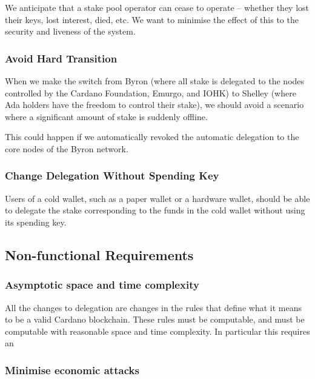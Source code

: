 \documentclass[11pt,a4paper]{article}
\begin{document}
We anticipate that a stake pool operator can cease to operate -- whether
they lost their keys, lost interest, died, etc. We want to minimise the
effect of this to the security and liveness of the system.

\subsubsection{Avoid Hard Transition}\label{avoid-hard-transition}

When we make the switch from Byron (where all stake is delegated to the
nodes controlled by the Cardano Foundation, Emurgo, and IOHK) to Shelley
(where Ada holders have the freedom to control their stake), we should
avoid a scenario where a significant amount of stake is suddenly
offline.

This could happen if we automatically revoked the automatic delegation
to the core nodes of the Byron network.

\subsubsection{Change Delegation Without Spending
Key}\label{change-delegation-without-spending-key}

Users of a cold wallet, such as a paper wallet or a hardware wallet,
should be able to delegate the stake corresponding to the funds in the
cold wallet without using its spending key.

\subsection{Non-functional
Requirements}\label{non-functional-requirements}

\subsubsection{Asymptotic space and time
complexity}\label{asymptotic-space-and-time-complexity}

All the changes to delegation are changes in the rules that define what
it means to be a valid Cardano blockchain. These rules must be
computable, and must be computable with reasonable space and time
complexity. In particular this requires an

\subsubsection{Minimise economic
attacks}\label{minimise-economic-attacks}
\end{document}
